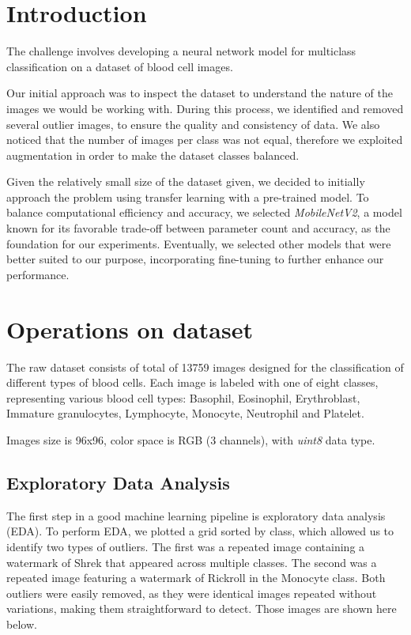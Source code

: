 \documentclass[11pt]{article}
\begin{document}
\section{Introduction}

The challenge involves developing a neural network model for multiclass classification on a dataset of blood cell images.

Our initial approach was to inspect the dataset to understand the nature of the images we would be working with. 
During this process, we identified and removed several outlier images, to ensure the quality and consistency of data. 
We also noticed that the number of images per class was not equal, therefore we exploited augmentation in order to make the dataset classes balanced.

Given the relatively small size of the dataset given, we decided to initially approach the problem using transfer learning with a pre-trained model.
To balance computational efficiency and accuracy, we selected \textit{MobileNetV2}, a model known for its favorable trade-off between parameter count and accuracy, as the foundation for our experiments.
Eventually, we selected other models that were better suited to our purpose, incorporating fine-tuning to further enhance our performance.

\section{Operations on dataset}
The raw dataset consists of total of 13759 images designed for the classification of different types of blood cells. Each image is labeled with one of eight classes, representing various blood cell types: Basophil, Eosinophil, Erythroblast, Immature granulocytes, Lymphocyte, Monocyte, Neutrophil and Platelet.

Images size is 96x96, color space is RGB (3 channels), with \textit{uint8} data type.

\subsection{Exploratory Data Analysis}

The first step in a good machine learning pipeline is exploratory data analysis (EDA).
To perform EDA, we plotted a grid sorted by class, which allowed us to identify two types of outliers.
The first was a repeated image containing a watermark of Shrek that appeared across multiple classes. 
The second was a repeated image featuring a watermark of Rickroll in the Monocyte class.
Both outliers were easily removed, as they were identical images repeated without variations, making them straightforward to detect.
Those images are shown here below.
\end{document}
